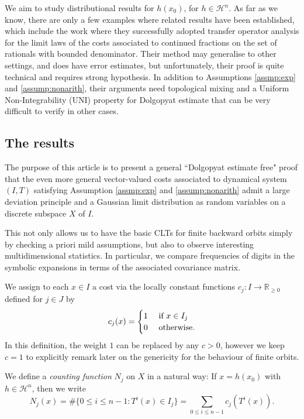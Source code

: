 \documentclass[12pt,a4paper,reqno]{amsart}
\begin{document}
We aim to study distributional results for $h(x_0)$, for $h \in \mathcal{H}^n$. As far as we know, there are only a few examples where related results have been established, which include the work \cite{baladi-vallee} where they successfully adopted transfer operator analysis for the limit laws of the costs associated to continued fractions on the set of rationals with bounded denominator. 
Their  method may generalise to other settings, and does have error estimates, but  unfortunately, their proof is quite technical and requires strong hypothesis. In addition to Assumptions \ref{assmp:exp} and \ref{assump:nonarith}, their arguments need  topological mixing and a Uniform Non-Integrability (UNI) property for Dolgopyat estimate that can be very difficult to verify in other cases.


\subsection{The results}\label{sec.main}
The purpose of this article is to present a general ``Dolgopyat estimate free" proof that the even more general vector-valued costs associated to  dynamical system $(I,T)$ satisfying Assumption \ref{assmp:exp} and \ref{assump:nonarith} admit a large deviation principle and  
a Gaussian limit distribution as random variables on a discrete subspace $X$ of $I$. 

This not only allows us to have the basic CLTs for finite backward  orbits simply by checking a priori mild assumptions, but also to observe interesting multidimensional statistics.  In particular, we compare frequencies of digits in the symbolic expansions in terms of the associated covariance matrix.

We assign to  each $x \in I$ a cost  via the locally constant functions $c_j: I \to \mathbb{R}_{\geq 0}$  defined for $j \in J$ by 
$$
c_j (x)= 
\begin{cases}
1 &\hbox{ if } x \in I_j \cr
0 & \hbox{ otherwise.} 
\end{cases}
$$
In this definition, the weight $1$ can be replaced by any $c>0$, however we keep $c=1$ to explicitly remark later on the genericity for the behaviour of finite orbits.

We define  a \emph{counting function} $N_j$ on $X$ in a natural way: If $x = h(x_0)$ with $h \in \mathcal H^n$, then we write
\[
N_j(x) = \#\{ 0\le i \le n-1 : T^{i}(x) \in I_j \}= \sum_{0\le i \le n-1} c_j( T^{i}(x)).\]
\end{document}
